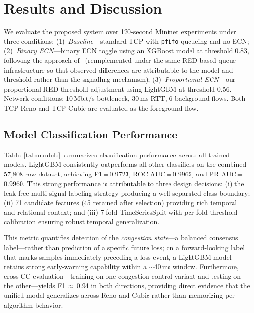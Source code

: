 \section{Results and Discussion}
\label{sec:results}

We evaluate the proposed system over 120-second Mininet experiments under three conditions: (1)~\emph{Baseline}---standard TCP with \texttt{pfifo} queueing and no ECN; (2)~\emph{Binary ECN}---binary ECN toggle using an XGBoost model at threshold 0.83, following the approach of~\cite{welzl2024} (reimplemented under the same RED-based queue infrastructure so that observed differences are attributable to the model and threshold rather than the signalling mechanism); (3)~\emph{Proportional ECN}---our proportional RED threshold adjustment using LightGBM at threshold 0.56. Network conditions: 10\,Mbit/s bottleneck, 30\,ms RTT, 6 background flows. Both TCP Reno and TCP Cubic are evaluated as the foreground flow.

\subsection{Model Classification Performance}

Table~\ref{tab:models} summarizes classification performance across all trained models. LightGBM consistently outperforms all other classifiers on the combined 57,808-row dataset, achieving F1\,=\,0.9723, ROC-AUC\,=\,0.9965, and PR-AUC\,=\,0.9960. This strong performance is attributable to three design decisions: (i) the leak-free multi-signal labeling strategy producing a well-separated class boundary; (ii) 71 candidate features (45 retained after selection) providing rich temporal and relational context; and (iii) 7-fold TimeSeriesSplit with per-fold threshold calibration ensuring robust temporal generalization.

This metric quantifies detection of the \emph{congestion state}---a balanced consensus label---rather than prediction of a specific future loss; on a forward-looking label that marks samples immediately preceding a loss event, a LightGBM model retains strong early-warning capability within a $\sim$40\,ms window. Furthermore, cross-CC evaluation---training on one congestion-control variant and testing on the other---yields F1\,$\approx$\,0.94 in both directions, providing direct evidence that the unified model generalizes across Reno and Cubic rather than memorizing per-algorithm behavior.

